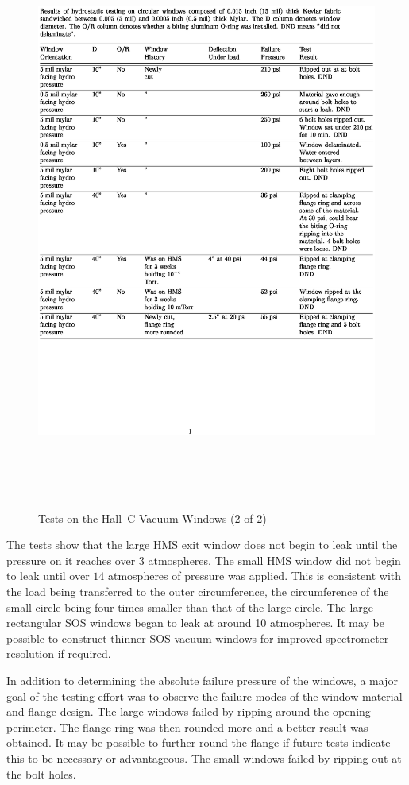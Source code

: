{{\begin{figure}
\includegraphics[height=7.5in]{vacuumc}
\caption{Tests on the Hall~C Vacuum Windows (2 of 2) \label{tab:win_tst2}}
\end{figure}
\clearpage

The tests show that the large HMS exit window does not begin to leak until
the pressure on it reaches over $3$ atmospheres. The small HMS window
did not begin to leak until over $14$ atmospheres of pressure was applied.
This is consistent with the load being transferred to
the outer circumference, the circumference of the small circle being four
times smaller than that of the large circle. The large rectangular SOS windows
began to leak at around 10 atmospheres. It may be possible to construct thinner
SOS vacuum windows for improved spectrometer resolution if required.

In addition to determining the absolute failure
pressure of the windows, a major goal of the testing effort was to
observe the failure modes of the
window material and flange design. The large windows failed by
ripping around the opening perimeter. The flange ring was then
rounded more and
a better result was obtained. It may be possible to further round the
flange if future tests indicate this to be necessary or advantageous.
The small windows failed by ripping out at the bolt holes.

}}
